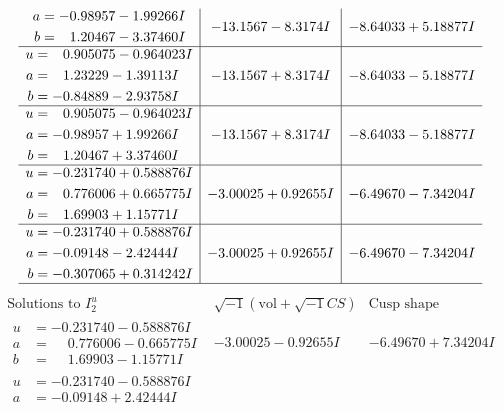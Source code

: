 \documentclass[1p]{elsarticle_modified}
\theoremstyle{definition}
\newcommand{\I}{\sqrt{-1}}
\begin{document}
$$\begin{array}{c|c|c}
\begin{aligned}
a &= -0.98957 - 1.99266 I \\
b &= \phantom{-}1.20467 - 3.37460 I\end{aligned}
 & -13.1567 - 8.3174 I & -8.64033 + 5.18877 I \\ \hline\begin{aligned}
u &= \phantom{-}0.905075 - 0.964023 I \\
a &= \phantom{-}1.23229 - 1.39113 I \\
b &= -0.84889 - 2.93758 I\end{aligned}
 & -13.1567 + 8.3174 I & -8.64033 - 5.18877 I \\ \hline\begin{aligned}
u &= \phantom{-}0.905075 - 0.964023 I \\
a &= -0.98957 + 1.99266 I \\
b &= \phantom{-}1.20467 + 3.37460 I\end{aligned}
 & -13.1567 + 8.3174 I & -8.64033 - 5.18877 I \\ \hline\begin{aligned}
u &= -0.231740 + 0.588876 I \\
a &= \phantom{-}0.776006 + 0.665775 I \\
b &= \phantom{-}1.69903 + 1.15771 I\end{aligned}
 & -3.00025 + 0.92655 I & -6.49670 - 7.34204 I \\ \hline\begin{aligned}
u &= -0.231740 + 0.588876 I \\
a &= -0.09148 - 2.42444 I \\
b &= -0.307065 + 0.314242 I\end{aligned}
 & -3.00025 + 0.92655 I & -6.49670 - 7.34204 I\\
 \hline 
 \end{array}$$\newpage$$\begin{array}{c|c|c}  
\text{Solutions to }I^u_{2}& \I (\text{vol} + \sqrt{-1}CS) & \text{Cusp shape}\\
 \hline 
\begin{aligned}
u &= -0.231740 - 0.588876 I \\
a &= \phantom{-}0.776006 - 0.665775 I \\
b &= \phantom{-}1.69903 - 1.15771 I\end{aligned}
 & -3.00025 - 0.92655 I & -6.49670 + 7.34204 I \\ \hline\begin{aligned}
u &= -0.231740 - 0.588876 I \\
a &= -0.09148 + 2.42444 I \\

\end{aligned}
\end{array}$$
\end{document}
